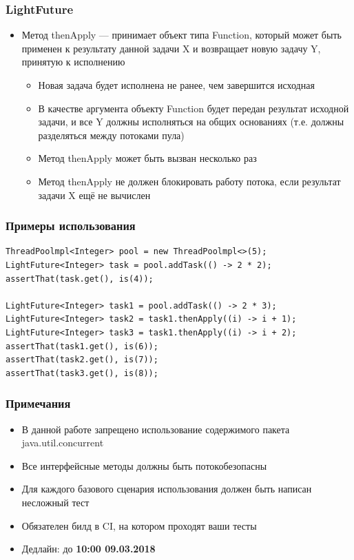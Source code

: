 \documentclass[xetex,mathserif,serif]{beamer}
\begin{document}
	\begin{frame}
		\frametitle{LightFuture}
		\begin{itemize}
			\item Метод thenApply --- принимает объект типа Function, который может быть применен к результату данной задачи X и возвращает новую задачу Y, принятую к исполнению
			\begin{itemize}
				\item Новая задача будет исполнена не ранее, чем завершится исходная
				\item В качестве аргумента объекту Function будет передан результат исходной задачи, и все Y должны исполняться на общих основаниях (т.е. должны разделяться между потоками пула)
				\item Метод thenApply может быть вызван несколько раз
				\item Метод thenApply не должен блокировать работу потока, если результат задачи X ещё не вычислен
			\end{itemize}
		\end{itemize}
	\end{frame}

	\begin{frame}[fragile]
		\frametitle{Примеры использования}
		\begin{footnotesize}
			\begin{verbatim}
ThreadPoolmpl<Integer> pool = new ThreadPoolmpl<>(5);
LightFuture<Integer> task = pool.addTask(() -> 2 * 2);
assertThat(task.get(), is(4));

LightFuture<Integer> task1 = pool.addTask(() -> 2 * 3);
LightFuture<Integer> task2 = task1.thenApply((i) -> i + 1);
LightFuture<Integer> task3 = task1.thenApply((i) -> i + 2);
assertThat(task1.get(), is(6));
assertThat(task2.get(), is(7));
assertThat(task3.get(), is(8));
			\end{verbatim}
		\end{footnotesize}
	\end{frame}

	\begin{frame}
		\frametitle{Примечания}
		\begin{itemize}
			\item В данной работе запрещено использование содержимого пакета java.util.concurrent
			\item Все интерфейсные методы должны быть потокобезопасны
			\item Для каждого базового сценария использования должен быть написан несложный тест
			\item Обязателен билд в CI, на котором проходят ваши тесты
			\item Дедлайн: до \textbf{10:00 09.03.2018}
		\end{itemize}
	\end{frame}
\end{document}
